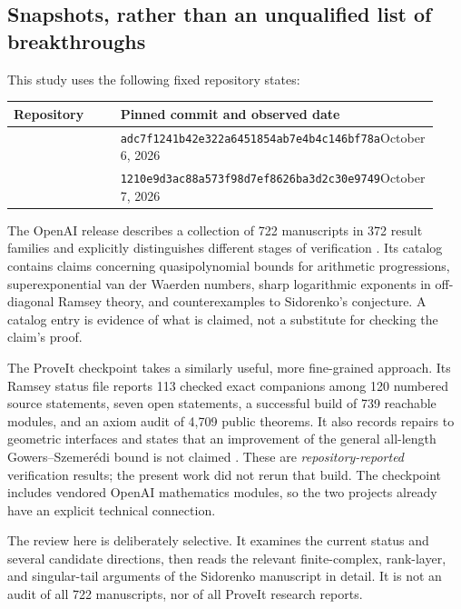 \documentclass[11pt]{article}
\theoremstyle{definition}
\theoremstyle{remark}
\newcommand{\1}{\mathbf 1}
\newcommand{\src}[1]{\texttt{\detokenize{#1}}}
\newcommand{\oaicommit}{\texttt{adc7f1241b42e322a6451854ab7e4b4c146bf78a}}
\newcommand{\picommit}{\texttt{1210e9d3ac88a573f98d7ef8626ba3d2c30e9749}}
\begin{document}
\subsection{Snapshots, rather than an unqualified list of breakthroughs}

This study uses the following fixed repository states:
\begin{center}
\begin{tabular}{@{}p{0.25\linewidth}p{0.68\linewidth}@{}}
\toprule
Repository & Pinned commit and observed date\\
\midrule
\src{openai/math} & \oaicommit\newline October 6, 2026\\[3pt]
\src{ProveIt} & \picommit\newline October 7, 2026\\
\bottomrule
\end{tabular}
\end{center}
The OpenAI release describes a collection of 722 manuscripts in 372 result
families and explicitly distinguishes different stages of verification
\cite{OpenAIReadme,OpenAICatalog}. Its catalog contains claims concerning
quasipolynomial bounds for arithmetic progressions, superexponential van der
Waerden numbers, sharp logarithmic exponents in off-diagonal Ramsey theory, and
counterexamples to Sidorenko's conjecture. A catalog entry is evidence of what
is claimed, not a substitute for checking the claim's proof.

The ProveIt checkpoint takes a similarly useful, more fine-grained approach.
Its Ramsey status file reports 113 checked exact companions among 120 numbered
source statements, seven open statements, a successful build of 739 reachable
modules, and an axiom audit of 4,709 public theorems. It also records repairs to
geometric interfaces and states that an improvement of the general all-length
Gowers--Szemer\'edi bound is not claimed \cite{ProveItStatus}. These are
\emph{repository-reported} verification results; the present work did not rerun
that build. The checkpoint includes vendored OpenAI mathematics modules, so the
two projects already have an explicit technical connection.

The review here is deliberately selective. It examines the current status and
several candidate directions, then reads the relevant finite-complex,
rank-layer, and singular-tail arguments of the Sidorenko manuscript in detail.
It is not an audit of all 722 manuscripts, nor of all ProveIt research reports.
\end{document}
